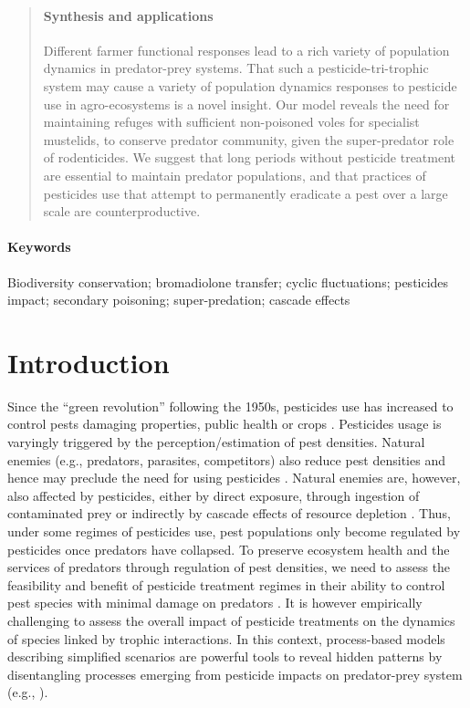 \documentclass[11pt]{article}
\begin{document}
\begin{abstract}
\paragraph{Synthesis and applications} Different farmer functional responses lead to a rich variety of population dynamics in predator-prey systems. That such a pesticide-tri-trophic system may cause a variety of population dynamics responses to pesticide use in agro-ecosystems is a novel insight. Our model reveals the need for maintaining refuges with sufficient non-poisoned voles for specialist mustelids, to conserve predator community, given the super-predator role of rodenticides. We suggest that long periods without pesticide treatment are essential to maintain predator populations, and that practices of pesticides use that attempt to permanently eradicate a pest over a large scale are counterproductive. 

\end{abstract}

\paragraph{Keywords} Biodiversity conservation; bromadiolone transfer; cyclic fluctuations; pesticides impact; secondary poisoning; super-predation; cascade effects

\section{Introduction}

Since the “green revolution” following the 1950s, pesticides use has increased to control pests damaging properties, public health or crops \citep{Tilman2002}. Pesticides usage is varyingly triggered by the perception/estimation of pest densities. Natural enemies (e.g., predators, parasites, competitors) also reduce pest densities and hence may preclude the need for using pesticides \citep{Michalko2017}. Natural enemies are, however, also affected by pesticides, either by direct exposure, through ingestion of contaminated prey \citep{Berny2007} or indirectly by cascade effects of resource depletion \citep{Halstead2014}.  Thus, under some regimes of pesticides use, pest populations only become regulated by pesticides once predators have collapsed. To preserve ecosystem health and the services of predators through regulation of pest densities, we need to assess the feasibility and benefit of pesticide treatment regimes in their ability to control pest species with minimal damage on predators \citep{Halstead2014}. It is however empirically challenging to assess the overall impact of pesticide treatments on the dynamics of species linked by trophic interactions. In this context, process-based models describing simplified scenarios are powerful tools to reveal hidden patterns by disentangling processes emerging from pesticide impacts on predator-prey system (e.g., \citet{Baudrot2018}).
\end{document}
